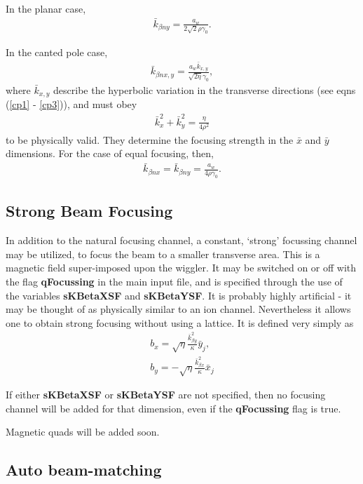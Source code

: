 \documentclass[12pt]{article}%
\begin{document}
In the planar case,
\begin{align}
\bar{k}_{\beta n y} = \frac{a_w}{2 \sqrt{2} \rho \gamma_0}.
\end{align}

In the canted pole case,
\begin{align}
\bar{k}_{\beta n x,y} = \frac{a_w \bar{k}_{x,y}}{\sqrt{2 \eta} \gamma_0},
\end{align}
where $\bar{k}_{x,y}$ describe the hyperbolic variation in the transverse directions (see eqns (\ref{cp1} - \ref{cp3})), and must obey 
\begin{align}
\bar{k}_x^2 + \bar{k}_y^2 = \frac{\eta}{4 \rho^2}
\end{align}
to be physically valid. They determine the focusing strength in the $\bar{x}$ and $\bar{y}$ dimensions. For the case of equal focusing, then,
\begin{align}
\bar{k}_{\beta n x} = \bar{k}_{\beta n y} = \frac{a_w }{ 4 \rho \gamma_0}.
\end{align}



\subsection{Strong Beam Focusing}

In addition to the natural focusing channel, a constant, `strong' focussing channel may be utilized, to focus the beam to a smaller transverse area. This is a magnetic field super-imposed upon the wiggler. It may be switched on or off with the flag {\bf qFocussing} in the main input file, and is specified through the use of the variables {\bf sKBetaXSF} and {\bf sKBetaYSF}. It is probably highly artificial - it may be thought of as physically similar to an ion channel. Nevertheless it allows one to obtain strong focusing without using a lattice. It is defined very simply as 
\begin{align}
b_x = \sqrt{\eta} \frac{\bar{k}_{\beta y}^2}{\kappa}\bar{y}_j, \\
b_y = - \sqrt{\eta} \frac{\bar{k}_{\beta x}^2}{\kappa}\bar{x}_j
\end{align}

If either {\bf sKBetaXSF} or {\bf sKBetaYSF} are not specified, then no focusing channel will be added for that dimension, even if the {\bf qFocussing} flag is true.

Magnetic quads will be added soon.


\subsection{Auto beam-matching}
\end{document}
